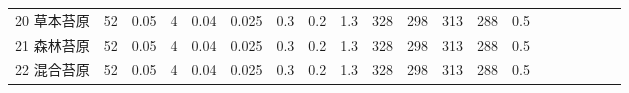 \begin{landscape}
\begin{table}[htbp]
\begin{tabular}{@{}lccccccccccccccccccc@{}}
    20 草本苔原    & 52                                                                & 0.05                                                                                                   & 4                                                                                  & 0.04                                                                               & 0.025                                                               & 0.3                                                       & 0.2                                                       & 1.3                                                       & 328                                                             & 298                                                             & 313                                                              & 288                                                               & 0.5                                                          \\
    21 森林苔原    & 52                                                                & 0.05                                                                                                   & 4                                                                                  & 0.04                                                                               & 0.025                                                               & 0.3                                                       & 0.2                                                       & 1.3                                                       & 328                                                             & 298                                                             & 313                                                              & 288                                                               & 0.5                                                          \\
    22 混合苔原    & 52                                                                & 0.05                                                                                                   & 4                                                                                  & 0.04                                                                               & 0.025                                                               & 0.3                                                       & 0.2                                                       & 1.3                                                       & 328                                                             & 298                                                             & 313                                                              & 288                                                               & 0.5                                                          \\

\end{tabular}
\end{table}
\end{landscape}
